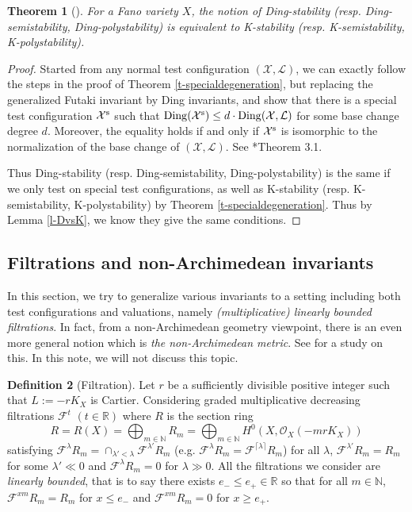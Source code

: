 \documentclass[12pt,reqno]{amsart}%
\newcommand{\cX}{{\mathcal{X}}}
\newcommand{\cL}{{\mathcal{L}}}
\newcommand{\cF}{\mathcal{F}}
\newtheorem{thm}{Theorem}[section]
\theoremstyle{definition}
\newtheorem{defn}[thm]{Definition}
\theoremstyle{remark}
\newcommand{\Ding}{{\rm Ding}}
\newcommand{\cO}{{\mathcal{O}}}
\newcommand{\N}{{\mathbb{N}}}
\newcommand{\la}{\lambda}
\begin{document}
\begin{thm}[{\cite{BBJ15, Fuj19b}}]\label{t-d=k}
For a Fano variety $X$, the notion of Ding-stability (resp. Ding-semistability, Ding-polystability) is equivalent to K-stability (resp. K-semistability, K-polystability).
\end{thm}
\begin{proof}Started from any normal test configuration $(\cX,\cL)$, we can exactly follow the steps in the proof of Theorem \ref{t-specialdegeneration}, but replacing the generalized Futaki invariant by Ding invariants, and show that there is a special test configuration $\cX^{\rm s}$ such that $\Ding(\cX^{\rm s})\le d\cdot \Ding(\cX,\cL)$ for some base change degree $d$. Moreover, the equality holds if and only if $\cX^{\rm s}$ is isomorphic to the normalization of the base change of $(\cX,\cL)$. See \cite{Fuj19b}*{Theorem 3.1}.

Thus Ding-stability (resp. Ding-semistability, Ding-polystability) is the same if we only test on special test configurations, as well as  K-stability (resp. K-semistability, K-polystability) by Theorem \ref{t-specialdegeneration}. Thus by Lemma \ref{l-DvsK}, we know they give the same conditions.
\end{proof}


\subsection{Filtrations and non-Archimedean invariants}

In this section, we try to generalize various invariants to a setting including both test configurations and valuations, namely {\it (multiplicative) linearly bounded  filtrations}. In fact, from a non-Archimedean geometry viewpoint, there is an even more general notion which is {\it the non-Archimedean metric}. See \cite{BHJ17,BBJ15, BoJ18} for a study on this. In this note, we will not discuss this topic. 

\begin{defn}[Filtration]\label{d-filtration}
Let $r$ be a sufficiently divisible positive integer such that $L:=-rK_X$ is Cartier.  Considering graded multiplicative decreasing filtrations $\cF^{t}$ $(t\in \mathbb{R})$ where $R$ is the section ring
\[R =R(X) =   \bigoplus_{m \in \N} R_{m}  = \bigoplus_{m \in \N}  H^0(X, \cO_X(-mrK_X))
\] 
satisfying $\cF^\la R_m = \cap_{\la ' < \la} \cF^{\la'} R_m$  (e.g. $\cF^\la R_m = \cF^{\lceil \la \rceil} R_m$) for  all $\la$, $\cF^{\lambda'} R_m =R_m$ for some $\lambda'\ll 0$ and $\cF^\la R_m=0$ for $\la \gg0$.
All the filtrations we consider are \emph{linearly bounded}, that is to say there exists $e_-\le e_+\in \mathbb R$ so that for all $m \in \N$, $\cF^{xm} R_m=R_m$ for $x\le e_-$ and  $\cF^{xm} R_m=0$ for $x\ge e_+$. 
\end{defn}
\end{document}
